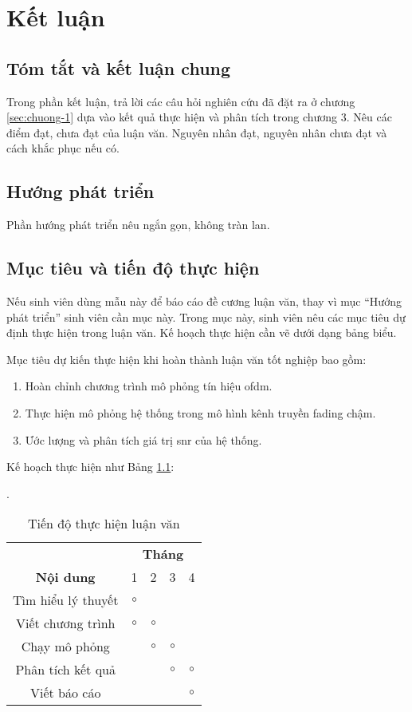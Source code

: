 \chapter{Kết luận}

\section{Tóm tắt và kết luận chung}

Trong phần kết luận, trả lời các câu hỏi nghiên cứu đã đặt ra ở chương \ref{sec:chuong-1} dựa vào kết quả thực hiện và phân tích trong chương 3. 
Nêu các điểm đạt, chưa đạt của luận văn. 
Nguyên nhân đạt, nguyên nhân chưa đạt và cách khắc phục nếu có. 

\section{Hướng phát triển}

Phần hướng phát triển nêu ngắn gọn, không tràn lan.

\section{Mục tiêu và tiến độ thực hiện}

Nếu sinh viên dùng mẫu này để báo cáo đề cương luận văn, thay vì mục ``Hướng phát triển'' sinh viên cần mục này.
Trong mục này, sinh viên nêu các mục tiêu dự định thực hiện trong luận văn.
Kế hoạch thực hiện cần vẽ dưới dạng bảng biểu.

\begin{exam}
	Mục tiêu dự kiến thực hiện khi hoàn thành luận văn tốt nghiệp bao gồm:
	\begin{enumerate}
	\item Hoàn chỉnh chương trình mô phỏng tín hiệu \ac{ofdm}.
	\item Thực hiện mô phỏng hệ thống trong mô hình kênh truyền fading chậm.
	\item Ước lượng và phân tích giá trị \ac{snr} của hệ thống.
	\end{enumerate}
	Kế hoạch thực hiện như Bảng \ref{tab:ke-hoach}:
	\begin{table}[ht]
		\caption{Tiến độ thực hiện luận văn}.
		\begin{center}
		\small
			\begin{tabular}{|c|c|c|c|c|}
				\hline
				\textbf{}&\multicolumn{4}{|c|}{\textbf{Tháng}} \\
				\cline{2-5} 
				\textbf{Nội dung} & 1& 2& 3& 4 \\
				\hline
				Tìm hiểu lý thuyết& $\circ$ & & & \\
				\hline
				Viết chương trình& $\circ$ & $\circ$ & & \\
				\hline
				Chạy mô phỏng& & $\circ$ & $\circ$ & \\
				\hline
				Phân tích kết quả& & & $\circ$ & $\circ$ \\
				\hline
				Viết báo cáo& & & & $\circ$\\
				\hline
			\end{tabular}
			\label{tab:ke-hoach}
		\end{center}
	\end{table}
\end{exam}